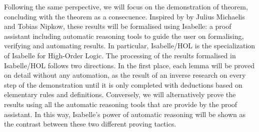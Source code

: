 \begin{isabellebody}
\begin{isamarkuptext}
Following the same perspective, we will focus on the demonstration of 
 theorem, concluding with the  theorem as a consecuence. Inspired by   by Julius Michaelis and Tobias Nipkow, 
these results will be formalised using Isabelle: a proof assistant including 
automatic reasoning tools to guide the user on formalising, verifying and 
automating results. In particular, Isabelle/HOL is the specialization of 
Isabelle for High-Order Logic. The processing of the results formalised in 
Isabelle/HOL follows two directions. In the first place, each lemma 
will be proved on detail without any automation, as the result of an 
inverse research on every step of the demonstration until it is only 
completed with deductions based on elementary rules and definitions. 
Conversely, we will alternatively prove the results using all the 
automatic reasoning tools that are provide by the proof assistant. In 
this way, Isabelle’s power of automatic reasoning will be shown as the 
contrast between these two different proving tactics.%
\end{isamarkuptext}\isamarkuptrue%
%
\begin{isamarkuptext}%
%
\end{isamarkuptext}\isamarkuptrue%
%
\isadelimtheory
%
\endisadelimtheory
%
\isatagtheory
%
\endisatagtheory
{\isafoldtheory}%
%
\isadelimtheory
%
\endisadelimtheory
%
\end{isabellebody}%
\endinput
